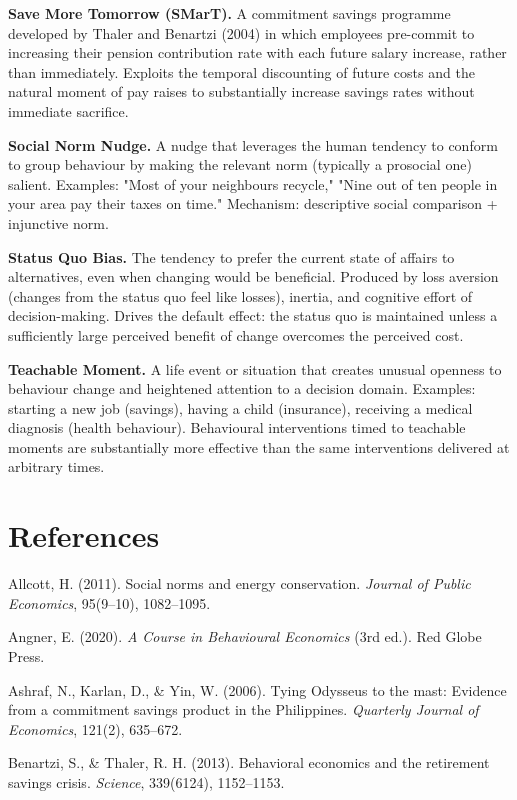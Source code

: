 \documentclass[12pt, letterpaper]{article}
\begin{document}
\textbf{Save More Tomorrow (SMarT).} A commitment savings programme developed by Thaler and Benartzi (2004) in which employees pre-commit to increasing their pension contribution rate with each future salary increase, rather than immediately. Exploits the temporal discounting of future costs and the natural moment of pay raises to substantially increase savings rates without immediate sacrifice.

\textbf{Social Norm Nudge.} A nudge that leverages the human tendency to conform to group behaviour by making the relevant norm (typically a prosocial one) salient. Examples: "Most of your neighbours recycle," "Nine out of ten people in your area pay their taxes on time." Mechanism: descriptive social comparison + injunctive norm.

\textbf{Status Quo Bias.} The tendency to prefer the current state of affairs to alternatives, even when changing would be beneficial. Produced by loss aversion (changes from the status quo feel like losses), inertia, and cognitive effort of decision-making. Drives the default effect: the status quo is maintained unless a sufficiently large perceived benefit of change overcomes the perceived cost.

\textbf{Teachable Moment.} A life event or situation that creates unusual openness to behaviour change and heightened attention to a decision domain. Examples: starting a new job (savings), having a child (insurance), receiving a medical diagnosis (health behaviour). Behavioural interventions timed to teachable moments are substantially more effective than the same interventions delivered at arbitrary times.

\newpage


\section*{References}


Allcott, H. (2011). Social norms and energy conservation. \textit{Journal of Public Economics}, 95(9--10), 1082--1095.

Angner, E. (2020). \textit{A Course in Behavioural Economics} (3rd ed.). Red Globe Press.

Ashraf, N., Karlan, D., \& Yin, W. (2006). Tying Odysseus to the mast: Evidence from a commitment savings product in the Philippines. \textit{Quarterly Journal of Economics}, 121(2), 635--672.

Benartzi, S., \& Thaler, R. H. (2013). Behavioral economics and the retirement savings crisis. \textit{Science}, 339(6124), 1152--1153.
\end{document}
